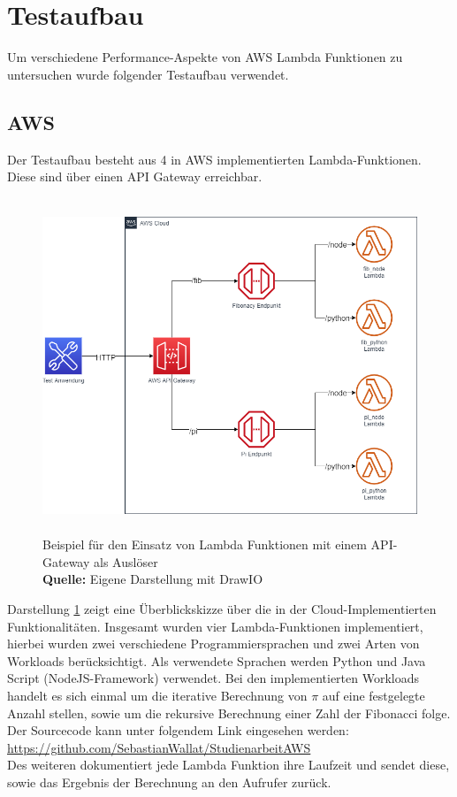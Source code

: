 \documentclass[12pt,a4paper,parskip=half]{scrreprt}
\newcommand*{\captionsource}[2]{%
	\caption[{#1}]{%
		#1%
		\\\hspace{\linewidth}%
		\textbf{Quelle:} #2%
	}%
}
\begin{document}
\section{Testaufbau}
Um verschiedene Performance-Aspekte von AWS Lambda Funktionen zu untersuchen wurde folgender Testaufbau verwendet.

\subsection{AWS}

Der Testaufbau besteht aus 4 in AWS implementierten Lambda-Funktionen. Diese sind über einen API Gateway erreichbar.

\FloatBarrier
\begin{figure}[h!]
	\centering
	\includegraphics[width=14cm, height=10cm]{LambdaLayout}
	\captionsource{Beispiel für den Einsatz von Lambda Funktionen mit einem API-Gateway als Auslöser}
	{Eigene Darstellung mit DrawIO}
	\label{Lambda_Aufbau}
\end{figure}

Darstellung \ref{Lambda_Aufbau} zeigt eine Überblickskizze über die in der Cloud-Implementierten Funktionalitäten. Insgesamt wurden vier Lambda-Funktionen implementiert, hierbei wurden zwei verschiedene Programmiersprachen und zwei Arten von Workloads berücksichtigt. Als verwendete Sprachen werden Python und Java Script (NodeJS-Framework) verwendet. Bei den implementierten Workloads handelt es sich einmal um die iterative Berechnung von $\pi$ auf eine festgelegte Anzahl stellen, sowie um die rekursive Berechnung einer Zahl der Fibonacci folge. Der Sourcecode kann unter folgendem Link eingesehen werden: \url{https://github.com/SebastianWallat/StudienarbeitAWS}
\\
Des weiteren dokumentiert jede Lambda Funktion ihre Laufzeit und sendet diese, sowie das Ergebnis der Berechnung an den Aufrufer zurück.
\end{document}
